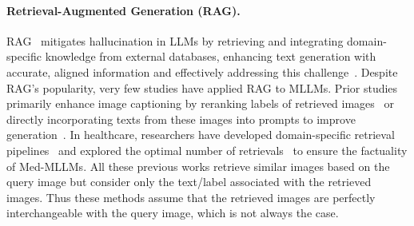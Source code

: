 \paragraph{Retrieval-Augmented Generation (RAG).} 
RAG~\cite{Lewis2020RetrievalAugmentedGF} mitigates hallucination in LLMs by retrieving and integrating domain-specific knowledge from external databases, enhancing text generation with accurate, aligned information and effectively addressing this challenge~\cite{Guu2020REALMRL, Siriwardhana2022ImprovingTD, Shahul2023RAGAsAE}.
Despite RAG's popularity, very few studies have applied RAG to MLLMs. 
Prior studies primarily enhance image captioning by reranking labels of retrieved images~\cite{Liu2024RARRA,Qu2024AlleviatingHI} or directly incorporating texts from these images into prompts to improve generation~\cite{Liu2023LearningCV, Sarto2024TowardsRA, Zhou2024Img2LocRI}. 
In healthcare, researchers have developed domain-specific retrieval pipelines~\cite{Sun2024FactAwareMR} and explored the optimal number of retrievals~\cite{Xia2024RULERM} to ensure the factuality of Med-MLLMs.
All these previous works retrieve similar images based on the query image but consider only the text/label associated with the retrieved images.
Thus these methods assume that the retrieved images are perfectly interchangeable with the query image, which is not always the case. 

